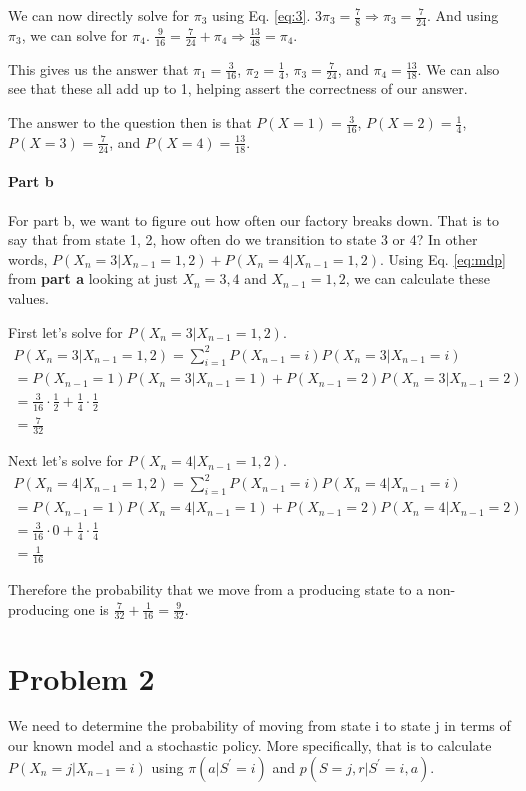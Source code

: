 \documentclass[12pt]{article}
\begin{document}
We can now directly solve for $\pi_3$ using Eq. \ref{eq:3}.
$3\pi_3 = \frac{7}{8} \Rightarrow \pi_3 = \frac{7}{24}$.
And using $\pi_3$, we can solve for $\pi_4$.
$\frac{9}{16} = \frac{7}{24} + \pi_4 \Rightarrow \frac{13}{48} = \pi_4$.

This gives us the answer that $\pi_1 = \frac{3}{16}$, $\pi_2 = \frac{1}{4}$, $\pi_3 = \frac{7}{24}$, and $\pi_4 = \frac{13}{18}$. We can also see that these all add up to 1, helping assert the correctness of our answer.

The answer to the question then is that $P(X=1) = \frac{3}{16}$, $P(X=2) = \frac{1}{4}$, $P(X=3) = \frac{7}{24}$, and $P(X=4) = \frac{13}{18}$.

\paragraph{Part b}
For part b, we want to figure out how often our factory breaks down. That is to say that from state 1, 2, how often do we transition to state 3 or 4? In other words, $P(X_n = 3 | X_{n-1} = 1, 2) + P(X_n = 4 | X_{n-1} = 1, 2)$.
Using Eq. \ref{eq:mdp} from \textbf{part a} looking at just $X_n = 3, 4$ and $X_{n-1} = 1,2$, we can calculate these values.

First let's solve for $P(X_n = 3 | X_{n-1} = 1, 2)$.
\begin{gather*}
  P(X_n = 3 | X_{n-1} = 1, 2) = \sum_{i=1}^2 P(X_{n-1}=i)P(X_n=3|X_{n-1}=i) \\
  = P(X_{n-1}=1)P(X_n=3|X_{n-1}=1) + P(X_{n-1}=2)P(X_n=3|X_{n-1}=2) \\
  = \frac{3}{16} \cdot \frac{1}{2} + \frac{1}{4} \cdot \frac{1}{2} \\
  = \frac{7}{32}
\end{gather*}

Next let's solve for $P(X_n = 4 | X_{n-1} = 1, 2)$.
\begin{gather*}
  P(X_n = 4 | X_{n-1} = 1, 2) = \sum_{i=1}^2 P(X_{n-1}=i)P(X_n=4|X_{n-1}=i) \\
  = P(X_{n-1}=1)P(X_n=4|X_{n-1}=1) + P(X_{n-1}=2)P(X_n=4|X_{n-1}=2) \\
  = \frac{3}{16} \cdot 0 + \frac{1}{4} \cdot \frac{1}{4} \\
  = \frac{1}{16}
\end{gather*}

Therefore the probability that we move from a producing state to a non-producing one is $\frac{7}{32} + \frac{1}{16} = \frac{9}{32}$.

\section{Problem 2}
We need to determine the probability of moving from state i to state j in terms of our known model and a stochastic policy. More specifically, that is to calculate $P(X_n = j | X_{n-1} = i)$ using $\pi(a|S^\prime=i)$ and $p(S = j, r | S^\prime = i, a)$.
\end{document}
